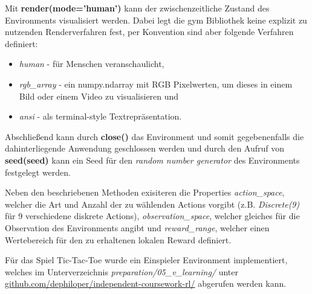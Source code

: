 \documentclass[11pt]{scrartcl}
\begin{document}
\noindent
Mit \textbf{render(mode='human')} kann der zwischenzeitliche Zustand des Environments
visualisiert werden. Dabei legt die gym Bibliothek keine explizit zu nutzenden Renderverfahren
fest, per Konvention sind aber folgende Verfahren definiert: 

\begin{itemize}
\itemsep0pt
\item \textit{human} - für Menschen veranschaulicht, 
\item \textit{rgb\_array} - ein numpy.ndarray mit RGB Pixelwerten, um dieses in einem Bild oder einem 
Video zu visualisieren und 
\item \textit{ansi} - als terminal-style Textrepräsentation.
\end{itemize}

\noindent
Abschließend kann durch \textbf{close()} das Environment und somit gegebenenfalls die 
dahinterliegende Anwendung geschlossen werden und durch den Aufruf von 
\textbf{seed(seed)} kann ein Seed für den \textit{random number generator}
des Environments festgelegt werden.
\newline

\noindent
Neben den beschriebenen Methoden exisiteren die Properties \textit{action\_space}, welcher die
Art und Anzahl der zu wählenden Actions vorgibt (z.B. \textit{Discrete(9)} für 9 verschiedene
diskrete Actions), \textit{observation\_space}, welcher gleiches für die Observation des
Environments angibt und \textit{reward\_range}, welcher einen Wertebereich für den zu erhaltenen
lokalen Reward definiert.
\newline

\noindent
Für das Spiel Tic-Tac-Toe wurde ein Einspieler Environment implementiert, welches im Unterverzeichnis
\textit{preparation/05\_v\_learning/} unter \url{github.com/dephiloper/independent-coursework-rl/}
abgerufen werden kann.
\end{document}
